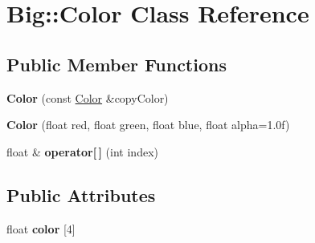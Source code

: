 \hypertarget{class_big_1_1_color}{}\section{Big\+:\+:Color Class Reference}
\label{class_big_1_1_color}
\subsection*{Public Member Functions}
\begin{DoxyCompactItemize}
\item 
\mbox{\label{class_big_1_1_color_adcaec101e8dd95fbcc4622b662e74404}} 
{\bfseries Color} (const \mbox{\hyperlink{class_big_1_1_color}{Color}} \&copy\+Color)
\item 
\mbox{\label{class_big_1_1_color_a58e6f19d5f3c24c24f389845ea1adbd7}} 
{\bfseries Color} (float red, float green, float blue, float alpha=1.\+0f)
\item 
\mbox{\label{class_big_1_1_color_ad7313105f14bb2cdb8eb87a68de94270}} 
float \& {\bfseries operator\mbox{[}$\,$\mbox{]}} (int index)
\end{DoxyCompactItemize}
\subsection*{Public Attributes}
\begin{DoxyCompactItemize}
\item 
\mbox{\label{class_big_1_1_color_a4348f7575dc0a9126e044281967c5c13}} 
float {\bfseries color} \mbox{[}4\mbox{]}
\end{DoxyCompactItemize}
